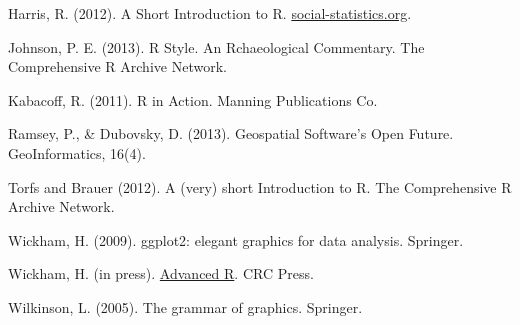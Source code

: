 \documentclass[]{article}
\begin{document}
Harris, R. (2012). A Short Introduction to R.
\href{http://www.social-statistics.org/}{social-statistics.org}.

Johnson, P. E. (2013). R Style. An Rchaeological Commentary. The
Comprehensive R Archive Network.

Kabacoff, R. (2011). R in Action. Manning Publications Co.

Ramsey, P., \& Dubovsky, D. (2013). Geospatial Software's Open Future.
GeoInformatics, 16(4).

Torfs and Brauer (2012). A (very) short Introduction to R. The
Comprehensive R Archive Network.

Wickham, H. (2009). ggplot2: elegant graphics for data analysis.
Springer.

Wickham, H. (in press). \href{http://adv-r.had.co.nz/}{Advanced R}. CRC
Press.

Wilkinson, L. (2005). The grammar of graphics. Springer.
\end{document}
